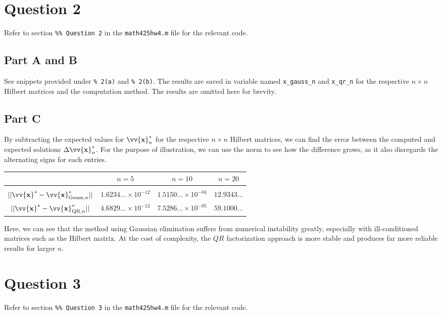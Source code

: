 \documentclass[12pt]{article}
\newcommand{\vect}[1]{\vv{\mathbf{#1}}}
\newcommand{\code}[1]{\texttt{#1}}
\begin{document}
\section*{Question 2}

Refer to section \code{\%\% Question 2} in the \code{math425hw4.m} file for the relevant code.

\subsection*{Part A and B}

See snippets provided under \code{\% 2(a)} and \code{\% 2(b)}. The results are saved in variable named \verb|x_gauss_n| and \verb|x_qr_n| for the respective $n\times n$ Hilbert matrices and the computation method. The results are omitted here for brevity.

\subsection*{Part C}

By subtracting the expected values for $\vect{x}^*_n$ for the respective $n\times n$ Hilbert matrices, we can find the error between the computed and expected solutions $\Delta\vect{x}^*_n$. For the purpose of illustration, we can use the norm to see how the difference grows, as it also disregards the alternating signs for each entries.

\begin{table}[H]
    \centering
    \begin{tabular}{cccc}
         & $n=5$ & $n=10$ & $n=20$ \\
        \hline \\
       $||\vect{x}^* - \vect{x}^*_{\text{Gauss}, n}||$  & $1.6234\ldots\times10^{-12}$ & $1.5150\ldots\times10^{-04}$ & $12.9343\ldots$\\
       $||\vect{x}^* - \vect{x}^*_{\text{QR}, n}||$ & $4.6829\ldots\times10^{-12}$ & $7.5286\ldots\times10^{-05}$ & $59.1000\ldots$ \\
    \end{tabular}
\end{table}

Here, we can see that the method using Gaussian elimination suffers from numerical instability greatly, especially with ill-conditioned matrices such as the Hilbert matrix. At the cost of complexity, the $QR$ factorization approach is more stable and produces far more reliable results for larger $n$.

\section*{Question 3}

Refer to section \code{\%\% Question 3} in the \code{math425hw4.m} file for the relevant code.
\end{document}
